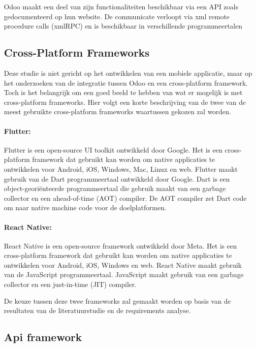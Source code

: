 Odoo maakt een deel van zijn functionaliteiten beschikbaar via een API zoals gedocumenteerd op hun website\autocite{odooExternalApi}.
De communicate verloopt via xml remote procedure calls (xmlRPC) en is beschikbaar in verschillende programmeertalen\autocite{xmlrpcWhatXMLRPC}

\subsection{Cross-Platform Frameworks}%
\label{subsec:cross-platform}
Deze studie is niet gericht op het ontwikkelen van een mobiele applicatie, maar op het onderzoeken van de integratie tussen Odoo en een cross-platform framework.
Toch is het belangrijk om een goed beeld te hebben van wat er mogelijk is met cross-platform frameworks.
Hier volgt een korte beschrijving van de twee van de meest gebruikte cross-platform frameworks waartussen gekozen zal worden.

\paragraph{Flutter:}
Flutter is een open-source UI toolkit ontwikkeld door Google.
Het is een cross-platform framework dat gebruikt kan worden om native applicaties te ontwikkelen voor Android, iOS, Windows, Mac, Linux en web.
Flutter maakt gebruik van de Dart programmeertaal ontwikkeld door Google.
Dart is een object-georiënteerde programmeertaal die gebruik maakt van een garbage collector en een ahead-of-time (AOT) compiler.
De AOT compiler zet Dart code om naar native machine code voor de doelplatformen.

\paragraph{React Native:}
React Native is een open-source framework ontwikkeld door Meta.
Het is een cross-platform framework dat gebruikt kan worden om native applicaties te ontwikkelen voor Android, iOS, Windows en web.
React Native maakt gebruik van de JavaScript programmeertaal.
JavaScript maakt gebruik van een garbage collector en een just-in-time (JIT) compiler.


De keuze tussen deze twee frameworks zal gemaakt worden op basis van de resultaten van de literatuurstudie en de requirements analyse.


\subsection{Api framework}%
\label{subsec:api_framework}

